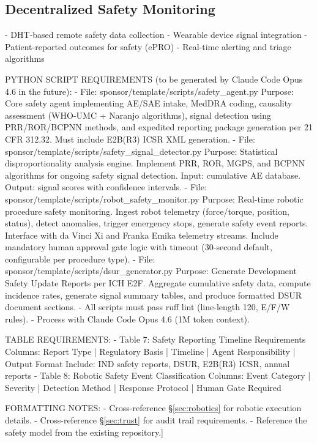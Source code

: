 \subsection{Decentralized Safety Monitoring}
- DHT-based remote safety data collection
- Wearable device signal integration
- Patient-reported outcomes for safety (ePRO)
- Real-time alerting and triage algorithms

PYTHON SCRIPT REQUIREMENTS (to be generated by Claude Code Opus 4.6 in the future):
- File: sponsor/template/scripts/safety\_agent.py
  Purpose: Core safety agent implementing AE/SAE intake, MedDRA coding, causality
  assessment (WHO-UMC + Naranjo algorithms), signal detection using PRR/ROR/BCPNN
  methods, and expedited reporting package generation per 21 CFR 312.32.
  Must include E2B(R3) ICSR XML generation.
- File: sponsor/template/scripts/safety\_signal\_detector.py
  Purpose: Statistical disproportionality analysis engine. Implement PRR, ROR,
  MGPS, and BCPNN algorithms for ongoing safety signal detection. Input: cumulative
  AE database. Output: signal scores with confidence intervals.
- File: sponsor/template/scripts/robot\_safety\_monitor.py
  Purpose: Real-time robotic procedure safety monitoring. Ingest robot telemetry
  (force/torque, position, status), detect anomalies, trigger emergency stops,
  generate safety event reports. Interface with da Vinci Xi and Franka Emika
  telemetry streams. Include mandatory human approval gate logic with timeout
  (30-second default, configurable per procedure type).
- File: sponsor/template/scripts/dsur\_generator.py
  Purpose: Generate Development Safety Update Reports per ICH E2F. Aggregate
  cumulative safety data, compute incidence rates, generate signal summary
  tables, and produce formatted DSUR document sections.
- All scripts must pass ruff lint (line-length 120, E/F/W rules).
- Process with Claude Code Opus 4.6 (1M token context).

TABLE REQUIREMENTS:
- Table 7: Safety Reporting Timeline Requirements
  Columns: Report Type | Regulatory Basis | Timeline | Agent Responsibility | Output Format
  Include: IND safety reports, DSUR, E2B(R3) ICSR, annual reports
- Table 8: Robotic Safety Event Classification
  Columns: Event Category | Severity | Detection Method | Response Protocol | Human Gate Required

FORMATTING NOTES:
- Cross-reference \S\ref{sec:robotics} for robotic execution details.
- Cross-reference \S\ref{sec:trust} for audit trail requirements.
- Reference the safety model from the existing repository.]

